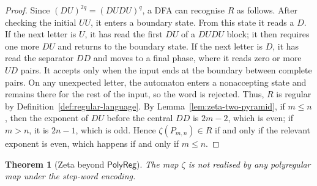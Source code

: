 \documentclass[11pt]{article}
\newtheorem{theorem}{Theorem}[section]
\theoremstyle{definition}
\newcommand{\polyreg}{\mathsf{PolyReg}}
\begin{document}
\begin{proof}
Since $(DU)^{2q}=(DUDU)^q$, a DFA can recognise $R$ as follows.  After checking
the initial $UU$, it enters a boundary state.  From this state it reads a $D$.
If the next letter is $U$, it has read the first $DU$ of a $DUDU$ block; it
then requires one more $DU$ and returns to the boundary state.  If the next
letter is $D$, it has read the separator $DD$ and moves to a final phase, where
it reads zero or more $UD$ pairs.  It accepts only when the input ends at the
boundary between complete pairs.  On any unexpected letter, the automaton
enters a nonaccepting state and remains there for the rest of the input, so the
word is rejected.  Thus, $R$ is regular by
Definition~\ref{def:regular-language}.  By
Lemma~\ref{lem:zeta-two-pyramid}, if $m\le n$, then the exponent of $DU$
before the central $DD$ is $2m-2$, which is even; if $m>n$, it is
$2n-1$, which is odd.  Hence $\zeta(P_{m,n})\in R$ if and only if the relevant
exponent is even, which happens if and only if $m\le n$.
\end{proof}

\begin{theorem}[Zeta beyond $\polyreg$]\label{thm:zeta-not-polyregular}
The map $\zeta$ is not realised by any polyregular map
under the step-word encoding.
\end{theorem}
\end{document}
